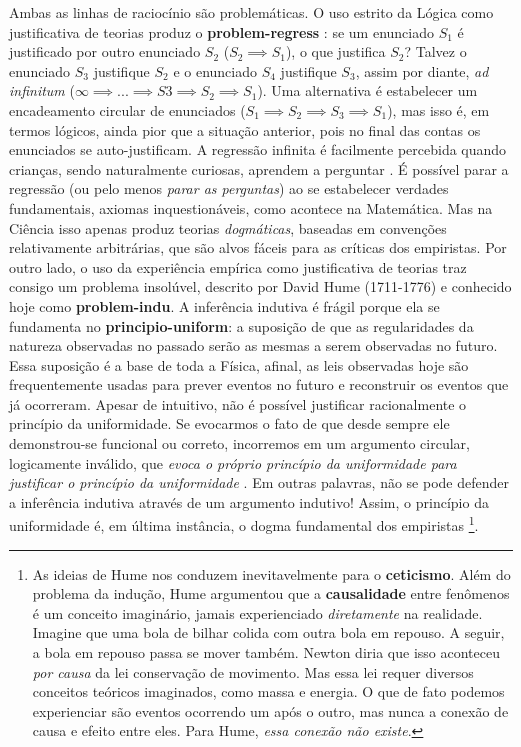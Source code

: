 \documentclass[./main.tex]{subfiles}
\begin{document}
\par Ambas as linhas de raciocínio são problemáticas. O uso estrito da Lógica como justificativa de teorias produz o \textbf{\gls{problem-regress}} \cite{cling2008}: se um enunciado $S_1$ é justificado por outro enunciado $S_2$ ($S_2 \implies S_1$), o que justifica $S_2$? Talvez o enunciado $S_3$ justifique $S_2$ e o enunciado $S_4$ justifique $S_3$, assim por diante, \textit{ad infinitum} ($\infty \implies ... \implies S3 \implies S_2 \implies S_1$). Uma alternativa é estabelecer um encadeamento circular de enunciados  ($S_1 \implies S_2 \implies S_3 \implies S_1$), mas isso é, em termos lógicos, ainda pior que a situação anterior, pois no final das contas os enunciados se auto-justificam. A regressão infinita é facilmente percebida quando crianças, sendo naturalmente curiosas, aprendem a perguntar . É possível parar a regressão (ou pelo menos \textit{parar as perguntas}) ao se estabelecer verdades fundamentais, axiomas inquestionáveis, como acontece na Matemática. Mas na Ciência isso apenas produz teorias \textit{dogmáticas}, baseadas em convenções relativamente arbitrárias, que são alvos fáceis para as críticas dos empiristas. Por outro lado, o uso da experiência empírica como justificativa de teorias traz consigo um problema insolúvel, descrito por David Hume (1711-1776) e conhecido hoje como \textbf{\gls{problem-indu}}. A inferência indutiva é frágil porque ela se fundamenta no \textbf{\gls{principio-uniform}}: a suposição de que as regularidades da natureza observadas no passado serão as mesmas a serem observadas no futuro. Essa suposição é a base de toda a Física, afinal, as leis observadas hoje são frequentemente usadas para prever eventos no futuro e reconstruir os eventos que já ocorreram. Apesar de intuitivo, não é possível justificar racionalmente o princípio da uniformidade. Se evocarmos o fato de que desde sempre ele demonstrou-se funcional ou correto, incorremos em um argumento circular, logicamente inválido, que \textit{evoca o próprio princípio da uniformidade para justificar o princípio da uniformidade} \cite{sep-induction-problem}. Em outras palavras, não se pode defender a inferência indutiva através de um argumento indutivo! Assim, o princípio da uniformidade é, em última instância, o dogma fundamental dos empiristas \footnote{As ideias de Hume nos conduzem inevitavelmente para o \textbf{ceticismo}. Além do problema da indução, Hume argumentou que a \textbf{causalidade} entre fenômenos é um conceito imaginário, jamais experienciado \textit{diretamente} na realidade. Imagine que uma bola de bilhar colida com outra bola em repouso. A seguir, a bola em repouso passa se mover também. Newton diria que isso aconteceu \textit{por causa} da lei conservação de movimento. Mas essa lei requer diversos conceitos teóricos imaginados, como massa e energia. O que de fato podemos experienciar são eventos ocorrendo um após o outro, mas nunca a conexão de causa e efeito entre eles. Para Hume, \textit{essa conexão não existe}. }.    
\end{document}
